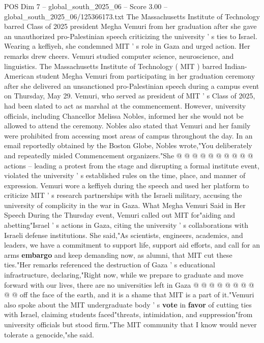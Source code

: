 \begin{textsample}{POS Dim 7 – global\_south\_2025\_06 – Score 3.00 – global\_south\_2025\_06/125366173.txt}  \label{ex:f7_pos_404}
The Massachusetts Institute of Technology barred Class of 2025 president Megha Vemuri from her graduation after she gave an unauthorized pro-Palestinian speech criticizing the university ' s ties to Israel.
Wearing a keffiyeh, she condemned MIT ' s role in Gaza and urged action.
Her remarks drew cheers.
Vemuri studied computer science, neuroscience, and linguistics.
The Massachusetts Institute of Technology ( MIT ) barred Indian-American student Megha Vemuri from participating in her graduation ceremony after she delivered an unsanctioned pro-Palestinian speech during a campus event on Thursday, May 29.
Vemuri, who served as president of MIT ' s Class of 2025, had been slated to act as marshal at the commencement.
However, university officials, including Chancellor Melissa Nobles, informed her she would not be allowed to attend the ceremony.
Nobles also stated that Vemuri and her family were prohibited from accessing most areas of campus throughout the day.
In an email reportedly obtained by the Boston Globe, Nobles wrote,"You deliberately and repeatedly misled Commencement organizers."She @ @ @ @ @ @ @ @ @ @ actions -- leading a protest from the stage and disrupting a formal institute event, violated the university ' s established rules on the time, place, and manner of expression.
Vemuri wore a keffiyeh during the speech and used her platform to criticize MIT ' s research partnerships with the Israeli military, accusing the university of complicity in the war in Gaza.
What Megha Vemuri Said in Her Speech During the Thursday event, Vemuri called out MIT for"aiding and abetting"Israel ' s actions in Gaza, citing the university ' s collaborations with Israeli defense institutions.
She said,"As scientists, engineers, academics, and leaders, we have a commitment to support life, support aid efforts, and call for an arms \textbf{embargo} and keep demanding now, as alumni, that MIT cut these ties."Her remarks referenced the destruction of Gaza ' s educational infrastructure, declaring,"Right now, while we prepare to graduate and move forward with our lives, there are no universities left in Gaza @ @ @ @ @ @ @ @ @ @ off the face of the earth, and it is a shame that MIT is a part of it."Vemuri also spoke about the MIT undergraduate body ' s \textbf{vote} in \textbf{favor} of cutting ties with Israel, claiming students faced"threats, intimidation, and suppression"from university officials but stood firm."The MIT community that I know would never tolerate a genocide,"she said.

\end{textsample}
